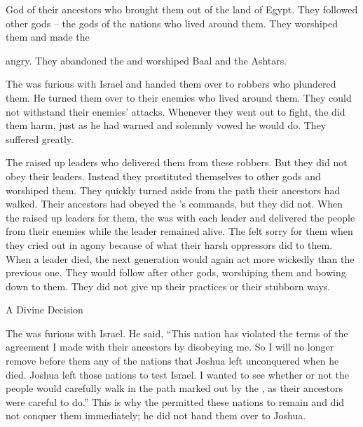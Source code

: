 {{}
God
of their ancestors
who brought them out
of the
land
of Egypt.
They followed
other
gods
– the gods
of the nations
who
lived around
them. They worshiped
them and made the

{}
angry.
They abandoned
the {}
and worshiped
Baal
and the Ashtars.
\par }{\PP {}The
{}
was furious
with Israel
and handed
them over
to robbers
who plundered
them. He turned
them over
to their enemies
who lived around
them. They could
not
withstand
their enemies’ attacks.
Whenever
they went out
to fight,
the {}
did
them harm,
just
as he had warned
and solemnly
vowed he would do. They suffered
greatly.
\par }{\PP {}The
{}
raised
up leaders
who delivered
them from these robbers.
But
they did not
obey
their leaders.
Instead
they prostituted
themselves
to other
gods
and worshiped
them. They quickly
turned aside
from
the path
their ancestors had
walked.
Their ancestors
had obeyed
the
{}’s
commands, but they did not.
When
the {}
raised up
leaders
for them, the
{}
was
with
each leader
and delivered
the people from
their enemies
while the leader
remained alive.
The
{}
felt sorry for them when they cried out in agony
because of
what their harsh
oppressors did to them.
When
a leader
died,
the next generation would again
act more wickedly
than the previous one.
They would follow
after
other
gods,
worshiping
them and bowing
down
to them. They did not
give up their practices
or their stubborn
ways.
\par }{\SH A Divine Decision
\par }{\PP {}The
{}
was furious
with Israel.
He said,
“This
nation
has violated
the terms
of the agreement
I
made with their ancestors
by disobeying me.
So I
will no
longer
remove before
them
any
of the nations
that
Joshua
left
unconquered
when he died.
Joshua left those nations to test
Israel.
I wanted
to see whether
or not
the people
would carefully
walk
in the path
marked
out by the
{}, as
their ancestors
were careful to do.”
This is why the
{}
permitted
these
nations
to remain and did not
conquer
them immediately;
he did not
hand
them over to Joshua.

}

